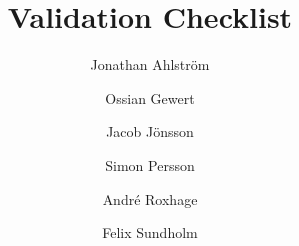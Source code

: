 \documentclass[a4paper]{article}
\title{Validation Checklist}
\author{Jonathan Ahlström \and Ossian Gewert \and Jacob Jönsson \and Simon Persson \and André Roxhage \and Felix Sundholm}
\begin{document}
\maketitle

\begin{center}
    
\end{center}


\end{document}
